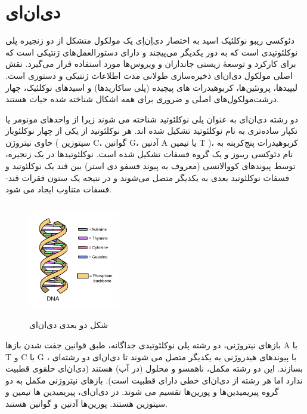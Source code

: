 \documentclass[12pt,a4paper,BCOR=.7cm,headsepline,bibliography=totoc]{report}
\begin{document}
\section{دی‌ان‌ای}

دئوکسی ریبو نوکلئیک اسید به اختصار دی‌اِن‌اِی یک مولکول متشکل از دو زنجیره پلی نوکلئوتیدی است که به دور یکدیگر می‌پیچند و دارای دستورالعمل‌های ژنتیکی است که برای کارکرد و توسعهٔ زیستی جانداران و ویروس‌ها مورد استفاده قرار می‌گیرد. نقش اصلی مولکول دی‌ان‌ای ذخیره‌سازی طولانی مدت اطلاعات ژنتیکی و دستوری است. لیپید‌ها، پروتئین‌ها، کربوهیدرات های پیچیده (پلی ساکاریدها) و اسیدهای نوکلئیک، چهار درشت‌مولکول‌های اصلی و ضروری برای همه اشکال شناخته شده حیات هستند.

دو رشته دی‌ان‌ای به عنوان پلی نوکلئوتید شناخته می شوند زیرا از واحدهای مونومر یا تکپار ساده‌تری به نام نوکلئوتید تشکیل شده اند. هر نوکلئوتید از یکی از چهار نوکلئوباز حاوی نیتروژن ( سیتوزین C، گوانین G، آدنین A یا تیمین T )،  کربوهیدرات پنج‌کربنه به نام دئوکسی ریبوز و یک گروه فسفات تشکیل شده است. نوکلئوتیدها در یک زنجیره، توسط پیوندهای کووالانسی (معروف به پیوند فسفو دی استر) بین قند یک نوکلئوتید و فسفات نوکلئوتید بعدی به یکدیگر متصل می‌شوند و در نتیجه یک ستون فقرات قند-فسفات متناوب ایجاد می شود.
\begin{figure}
\centering
\includegraphics[width=4cm, height=5cm]{pictures/DNApng.png}
\caption{
شکل دو بعدی دی‌ان‌ای \cite{graph1}
}\label{wrap-fig:2}
\end{figure}
 بازهای نیتروژنی، دو رشته پلی نوکلئوتیدی جداگانه، طبق قوانین جفت شدن باز‌ها 
\lr{)}A با T و C با G\lr{(}
، با پیوندهای هیدروژنی به یکدیگر متصل می شوند تا دی‌ان‌ای دو رشته‌ای بسازند. این دو رشته مکمل، ناهمسو و محلول (در آب) هستند (دی‌ان‌ای حلقوی قطبیت ندارد اما هر رشته از دی‌ان‌ای خطی دارای قطبیت است). بازهای نیتروژنی مکمل به دو گروه پیریمیدین‌ها و پورین‌ها تقسیم می شوند. در دی‌ان‌ای، پیریمیدین ها تیمین و سیتوزین هستند. پورین‌ها آدنین و گوانین هستند.
\end{document}
